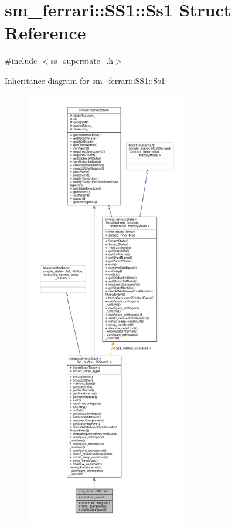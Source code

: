 \hypertarget{structsm__ferrari_1_1SS1_1_1Ss1}{}\section{sm\+\_\+ferrari\+:\+:S\+S1\+:\+:Ss1 Struct Reference}
\label{structsm__ferrari_1_1SS1_1_1Ss1}


{\ttfamily \#include $<$ss\+\_\+superstate\+\_.\+h$>$}



Inheritance diagram for sm\+\_\+ferrari\+:\+:S\+S1\+:\+:Ss1\+:
\nopagebreak
\begin{figure}[H]
\begin{center}
\leavevmode
\includegraphics[height=550pt]{structsm__ferrari_1_1SS1_1_1Ss1__inherit__graph}
\end{center}
\end{figure}


